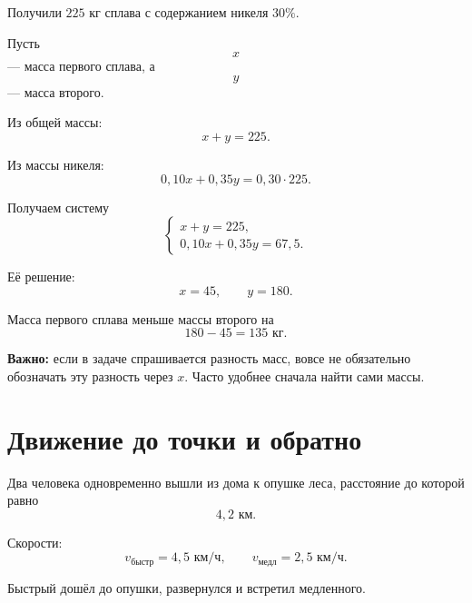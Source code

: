 \documentclass[a4paper,12pt]{article}
\newcommand{\key}[1]{\textcolor{darkaccent}{\textbf{#1}}}
\begin{document}
Получили \(225\) кг сплава с содержанием никеля \(30\%\).

Пусть
\[
x
\]
--- масса первого сплава,
а
\[
y
\]
--- масса второго.

Из общей массы:
\[
x+y=225.
\]

Из массы никеля:
\[
0{,}10x+0{,}35y=0{,}30\cdot225.
\]

Получаем систему
\[
\begin{cases}
x+y=225,\\
0{,}10x+0{,}35y=67{,}5.
\end{cases}
\]

Её решение:
\[
x=45,
\qquad
y=180.
\]

Масса первого сплава меньше массы второго на
\[
180-45=135\text{ кг}.
\]

\key{Важно:}
если в задаче спрашивается разность масс, вовсе не обязательно
обозначать эту разность через \(x\).
Часто удобнее сначала найти сами массы.


\section{Движение до точки и обратно}

Два человека одновременно вышли из дома к опушке леса,
расстояние до которой равно
\[
4{,}2\text{ км}.
\]

Скорости:
\[
v_{\text{быстр}}=4{,}5\text{ км/ч},
\qquad
v_{\text{медл}}=2{,}5\text{ км/ч}.
\]

Быстрый дошёл до опушки, развернулся и встретил медленного.

\begin{center}
\end{center}
\end{document}
